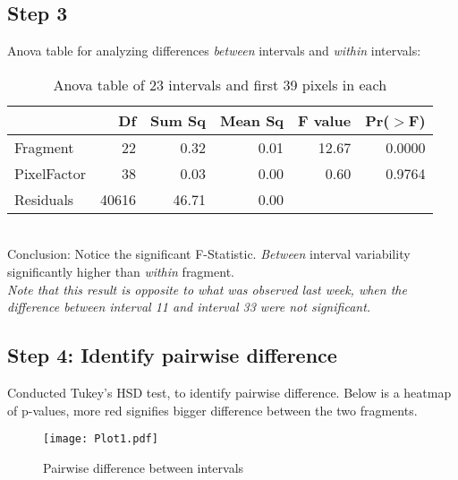 \documentclass[14pt]{article}
\begin{document}
\subsection*{Step 3}
Anova table for analyzing differences {\it{between}} intervals and {\it{within}} intervals: \\
\begin{table}[ht]
\centering
\begin{tabular}{lrrrrr}
  \hline
 & Df & Sum Sq & Mean Sq & F value & Pr($>$F) \\ 
  \hline
Fragment & 22 & 0.32 & 0.01 & 12.67 & 0.0000 \\ 
  PixelFactor & 38 & 0.03 & 0.00 & 0.60 & 0.9764 \\ 
  Residuals & 40616 & 46.71 & 0.00 &  &  \\ 
   \hline
\end{tabular}
\caption{Anova table of 23 intervals and first 39 pixels in each}
\end{table}
\\
Conclusion: Notice the significant F-Statistic. {\it{Between}} interval variability significantly higher than {\it{within}} fragment. \\
{\it{Note that this result is opposite to what was observed last week, when the difference between interval 11 and interval 33 were not significant.}}

\subsection*{Step 4: Identify pairwise difference}
Conducted Tukey's HSD test, to identify pairwise difference. Below is a heatmap of p-values, more red signifies bigger difference between the two fragments.
\begin{figure}[H]
\centering
\texttt{[image: Plot1.pdf]}
\caption{Pairwise difference between intervals}
\end{figure}
\end{document}
